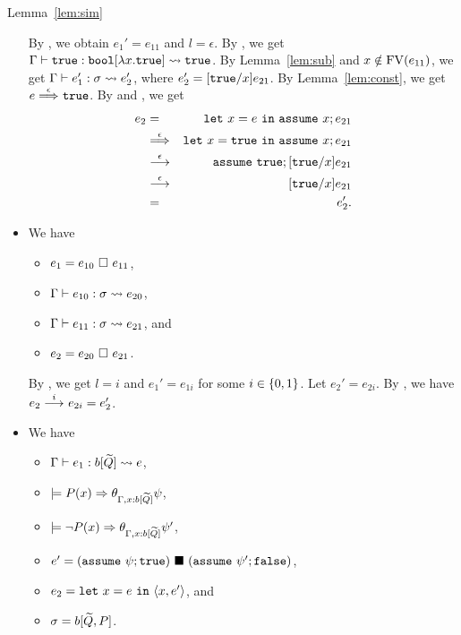 \begin{pfof}{Lemma~\ref{lem:sim}}
\begin{itemize}
By , we obtain \(e_1'=e_{11}\) and \(l=\epsilon\).
%
By , we get \(\Gamma \vdash \mathtt{true} : \mathtt{bool}[\lambda x.\mathtt{true}] \leadsto \mathtt{true}\).
By Lemma~\ref{lem:sub} and \(x \notin\mathrm{FV}(e_{11})\), we get
\(\Gamma \vdash e_1' : \sigma \leadsto e_2'\), where
\(e_2'=[\mathtt{true}/x]e_{21}\).
%
%
By Lemma~\ref{lem:const}, we get \(e \stackrel{\epsilon}{\Longrightarrow}_{} \mathtt{true}\).
By  and , we get
\begin{eqnarray*}
e_2 &=&\mathtt{let~}x=e\mathtt{~in~}{\mathtt{assume~}x; e_{21}} \\
    &\stackrel{\epsilon}{\Longrightarrow}_{}& \mathtt{let~}x=\mathtt{true}\mathtt{~in~}\mathtt{assume~}x; e_{21} \\
    &\stackrel{\epsilon}{\longrightarrow}_{}& \mathtt{assume~}\mathtt{true}; [\mathtt{true}/x]e_{21} \\
    &\stackrel{\epsilon}{\longrightarrow}_{}& [\mathtt{true}/x]e_{21} \\
    &=& e_2'.
\end{eqnarray*}

\item[] 
We have
\begin{itemize}
\item \(e_1=e_{10}\ \square\ e_{11}\),
\item \(\Gamma \vdash e_{10} : \sigma \leadsto e_{20}\),
\item \(\Gamma \vdash e_{11} : \sigma \leadsto e_{21}\), and
\item \(e_2=e_{20}\ \square\ e_{21}\).
\end{itemize}

By , we get \(l=i\) and \(e_1'=e_{1i}\) for some \(i \in \{0,1\}\).
Let \(e_2'=e_{2i}\).
By , we have \(e_2 \stackrel{i}{\longrightarrow}_{} e_{2i}=e_2'\).

\item[] 
We have
\begin{itemize}
\item \(\Gamma \vdash e_1 : b[\widetilde{Q}] \leadsto e\),
\item \(\models P(x) \Rightarrow \theta_{\Gamma,x:b[\widetilde{Q}]}\psi\),
\item \(\models \neg P(x) \Rightarrow \theta_{\Gamma,x:b[\widetilde{Q}]}\psi'\),
\item \(e'=(\mathtt{assume~}\psi; \mathtt{true})\ \blacksquare\ (\mathtt{assume~}\psi'; \mathtt{false})\),
\item \(e_2=\mathtt{let~}x=e\mathtt{~in~}{\langle{x,e'}\rangle}\), and
\item \(\sigma=b[\widetilde{Q},P]\).
\end{itemize}


\end{itemize}
\end{pfof}
